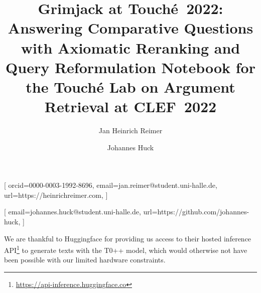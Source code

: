 \documentclass{ceurart}
\begin{document}

\title{%
  Grimjack at \texorpdfstring{Touché~2022}{Touche 2022}:\texorpdfstring{\\}{ }
  Answering Comparative Questions with Axiomatic Reranking and Query Reformulation%
}
\title[mode=sub]{%
  Notebook for the Touché Lab on Argument Retrieval at CLEF\ 2022%
}

\author{Jan Heinrich Reimer}[
  orcid=0000-0003-1992-8696,
  email=jan.reimer@student.uni-halle.de,
  url=https://heinrichreimer.com,
]
\author{Johannes Huck}[
  email=johannes.huck@student.uni-halle.de,
  url=https://github.com/johannes-huck,
]

\address{%
  Martin-Luther-Universität Halle-Wittenberg,
  06099~Halle~(Saale), Germany
}



\maketitle







\begin{acknowledgments}
  We are thankful to Huggingface for providing us access to their hosted inference API\footnote{\url{https://api-inference.huggingface.co}} to generate texts with the T0++ model, which would otherwise not have been possible with our limited hardware constraints. 
\end{acknowledgments}


\end{document}
